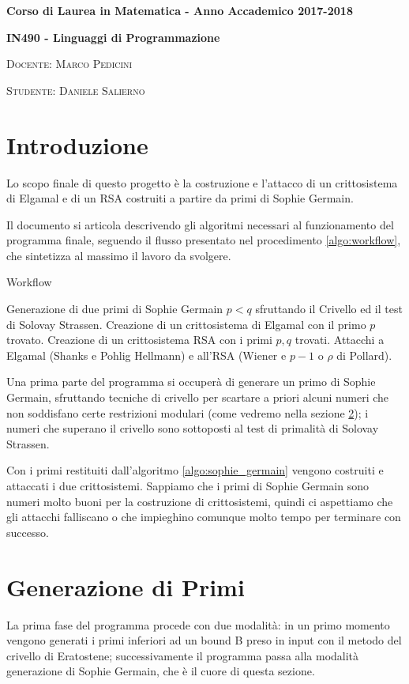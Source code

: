 \documentclass[a4paper, twoside]{article}
\theoremstyle{plain}
\theoremstyle{definition}
\begin{document}
\begin{center}
	\textbf{Corso di Laurea in Matematica - Anno Accademico 2017-2018}

	\textbf{\Large IN490 - Linguaggi di Programmazione}

	\textsc{\small Docente: Marco Pedicini}

	\textsc{\small Studente: Daniele Salierno}
\end{center}
\section{Introduzione}
Lo scopo finale di questo progetto è la costruzione e l'attacco di un crittosistema di Elgamal e di un RSA costruiti a partire da primi di Sophie Germain.

Il documento si articola descrivendo gli algoritmi necessari al funzionamento del programma finale, seguendo il flusso presentato nel procedimento \ref{algo:workflow}, che sintetizza al massimo il lavoro da svolgere.

	\begin{algorithm}
	\BlankLine
	\DontPrintSemicolon
 	\caption{Workflow}
 	\label{algo:workflow}

 	Generazione di due primi di Sophie Germain $p<q$ sfruttando il Crivello ed il test di Solovay Strassen.\;
 	Creazione di un crittosistema di Elgamal con il primo $p$ trovato.\;
 	Creazione di un crittosistema RSA con i primi $p,q$ trovati.\;
 	Attacchi a Elgamal (Shanks e Pohlig Hellmann) e all'RSA (Wiener e $p-1$ o $\rho$ di Pollard).\;
	\end{algorithm}

	Una prima parte del programma si occuperà di generare un primo di Sophie Germain, sfruttando tecniche di crivello per scartare a priori alcuni numeri che non soddisfano certe restrizioni modulari (come vedremo nella sezione \ref{sec_sophie_germain}); i numeri che superano il crivello sono sottoposti al test di primalità di Solovay Strassen.

	Con i primi restituiti dall'algoritmo \ref{algo:sophie_germain} vengono costruiti e attaccati i due crittosistemi. Sappiamo che i primi di Sophie Germain sono numeri molto buoni per la costruzione di crittosistemi, quindi ci aspettiamo che gli attacchi falliscano o che impieghino comunque molto tempo per terminare con successo.

	\section{Generazione di Primi}\label{sec_sophie_germain}
		La prima fase del programma procede con due modalità: in un primo momento vengono generati i primi inferiori ad un bound B preso in input con il metodo del crivello di Eratostene; successivamente il programma passa alla modalità generazione di Sophie Germain, che è il cuore di questa sezione.
\end{document}
